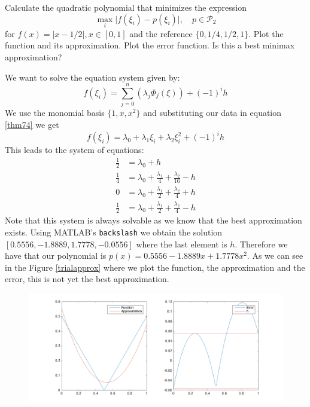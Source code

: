\begin{problem}
Calculate the quadratic polynomial that minimizes the expression
\begin{equation}
\max_i \lvert f (\xi_i) - p(\xi_i) \rvert, \quad p \in \mathcal{P}_2 
\end{equation}
for $f (x) = \lvert x - 1/2\rvert, x \in [0, 1]$ and the reference $\{0, 1/4, 1/2, 1\}$. Plot the function and its approximation. Plot the error function. Is this a best minimax approximation?
\end{problem}

\begin{solution}
We want to solve the equation system given by:
\begin{equation}
f(\xi_i) = \sum_{j=0}^n\left(\lambda_j\Phi_j(\xi)\right)+(-1)^ih
\label{thm74}
\end{equation}
We use the monomial basis $\{1,x,x^2\}$ and substituting our data in equation \ref{thm74} we get
\begin{equation}
f(\xi_i) = \lambda_0 + \lambda_1 \xi_i + \lambda_2 \xi_i^2 + (-1)^ih
\end{equation}
This leads to the system of equations:
\begin{align*}
\frac{1}{2} &= \lambda_0 + h \\
\frac{1}{4} &= \lambda_0 + \frac{\lambda_1}{4} + \frac{\lambda_2}{16} - h \\
0 &= \lambda_0 + \frac{\lambda_1}{2} + \frac{\lambda_2}{4} + h \\
\frac{1}{2} &= \lambda_0 + \frac{\lambda_1}{2} + \frac{\lambda_2}{4} - h
\end{align*}
Note that this system is always solvable as we know that the best approximation exists. Using MATLAB's \texttt{backslash} we obtain the solution $[0.5556, -1.8889, 1.7778, -0.0556]$ where the last element is $h$. Therefore we have that our polynomial is $p(x) = 0.5556 -1.8889x + 1.7778x^2$. As we can see in the Figure \ref{trialapprox} where we plot the function, the approximation and the error, this is not yet the best approximation.
\begin{figure}[h]
\centering 
\includegraphics[scale = 0.25]{figtask2hwk4.png}

\end{figure}
\end{solution}
